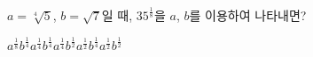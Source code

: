 $a=\sqrt[4]{5}$, $b=\sqrt{7}$일 때, $35^{\frac{1}{8}}$을 $a$, $b$를 이용하여 나타내면?
\begin{choices32}{$a^{\frac{1}{8}}b^{\frac{1}{4}}$}{$a^{\frac{1}{4}}b^{\frac{1}{4}}$}{$a^{\frac{1}{4}}b^{\frac{1}{2}}$}{$a^{\frac{1}{2}}b^{\frac{1}{4}}$}{$a^{\frac{1}{2}}b^{\frac{1}{2}}$}\end{choices32}
